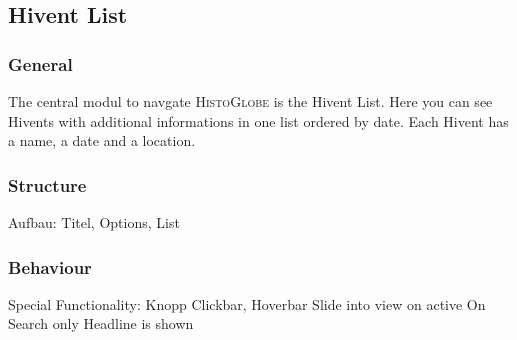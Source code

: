 \subsection{Hivent List}

\subsubsection{General} %
\label{ssub:general_hl}
The central modul to navgate \textsc{HistoGlobe} is the Hivent List. Here you can see Hivents with additional informations in one list ordered by date. Each Hivent has a name, a date and a location.

\subsubsection{Structure} %
\label{ssub:structure_hl}
Aufbau: Titel, Options, List


\subsubsection{Behaviour} %
\label{ssub:behaviour_hl}
Special Functionality: Knopp
Clickbar, Hoverbar
Slide into view on active
On Search only Headline is shown